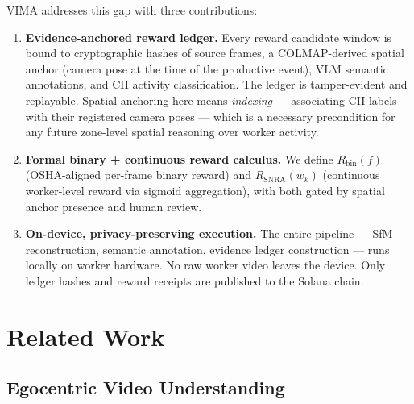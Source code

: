 \documentclass[sigconf,nonacm]{acmart}
\begin{document}
VIMA addresses this gap with three contributions:
\begin{enumerate}[leftmargin=1.4em,itemsep=0.2em]
\item \textbf{Evidence-anchored reward ledger.} Every reward candidate window
  is bound to cryptographic hashes of source frames, a COLMAP-derived spatial
  anchor (camera pose at the time of the productive event), VLM semantic
  annotations, and CII activity classification. The ledger is tamper-evident
  and replayable. Spatial anchoring here means \emph{indexing} --- associating
  CII labels with their registered camera poses --- which is a necessary
  precondition for any future zone-level spatial reasoning over worker activity.
\item \textbf{Formal binary + continuous reward calculus.} We define
  $R_{\text{bin}}(f)$ (OSHA-aligned per-frame binary reward) and
  $R_{\text{SNRA}}(w_k)$ (continuous worker-level reward via sigmoid aggregation),
  with both gated by spatial anchor presence and human review.
\item \textbf{On-device, privacy-preserving execution.} The entire pipeline ---
  SfM reconstruction, semantic annotation, evidence ledger construction --- runs
  locally on worker hardware. No raw worker video leaves the device. Only ledger
  hashes and reward receipts are published to the Solana chain.
\end{enumerate}

\section{Related Work}

\subsection{Egocentric Video Understanding}
\end{document}
